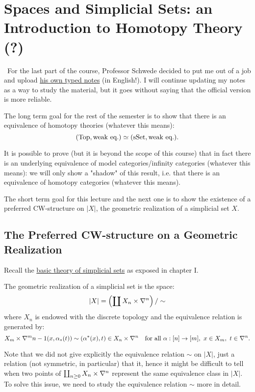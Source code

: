 
\chapter{Spaces and Simplicial Sets: an Introduction to Homotopy Theory (?)}\label{chapter:the-cool-chapter}

\Attention\ For the last part of the course, Professor Schwede decided to put me out of a job and upload \href{https://www.math.uni-bonn.de/people/schwede/sset_vs_spaces.pdf}{his own typed notes} (in English!). I will continue updating my notes as a way to study the material, but it goes without saying that the official version is more reliable.\medskip


The long term goal for the rest of the semester is to show that there is an equivalence of homotopy theories (whatever this means):
\[({\mathrm{Top}},\text{weak eq.})\simeq({\mathrm{sSet}},\text{weak eq.}).\]

It is possible to prove (but it is beyond the scope of this course) that in fact there is an underlying equivalence of model categories/infinity categories (whatever this means): we will only show a "shadow" of this result, i.e. that there is an equivalence of homotopy categories (whatever this means).

The short term goal for this lecture and the next one is to show the existence of a preferred CW-structure on $|X|$, the geometric realization of a simplicial set $X$.

\section{The Preferred CW-structure on a Geometric Realization}
Recall the \hyperref[section:reminder-on-sset]{basic theory of simplicial sets} as exposed in chapter I.

The geometric realization of a simplicial set is the space:
\[|X|=\left(\coprod X_n\times\nabla^n\right)/\sim\]
where $X_n$ is endowed with the discrete topology and the equivalence relation is generated by:
\[X_m\times\nabla^m\cont(x,\alpha_*(t))\sim(\alpha^*(x),t)\in X_n\times\nabla^n\quad\text{for all }\alpha:[n]\to[m],\ x\in X_m,\ t\in\nabla^n.\]

Note that we did not give explicitly the equivalence relation $\sim$ on $|X|$, just a relation (not symmetric, in particular) that  it,
hence it might be difficult to tell when two points of $\coprod_{n\ge0} X_n\times\nabla^n$ represent the same equivalence class in $|X|$.
To solve this issue, we need to study the equivalence relation $\sim$ more in detail.


